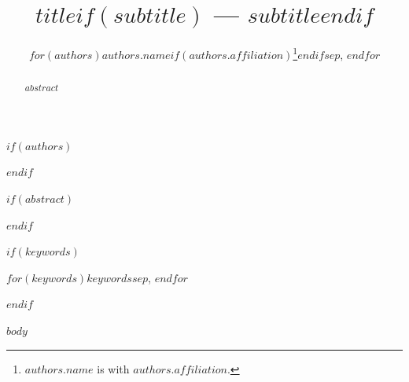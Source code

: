 \documentclass[journal]{IEEEtran}
\begin{document}
\title{$title$$if(subtitle)$ --- $subtitle$$endif$}

$if(authors)$
\author{$for(authors)$$authors.name$$if(authors.affiliation)$\thanks{$authors.name$ is with $authors.affiliation$.}$endif$$sep$, $endfor$}
$endif$

\maketitle

$if(abstract)$
\begin{abstract}
$abstract$
\end{abstract}
$endif$

$if(keywords)$
\begin{IEEEkeywords}
$for(keywords)$$keywords$$sep$, $endfor$
\end{IEEEkeywords}
$endif$

$body$
\end{document}
